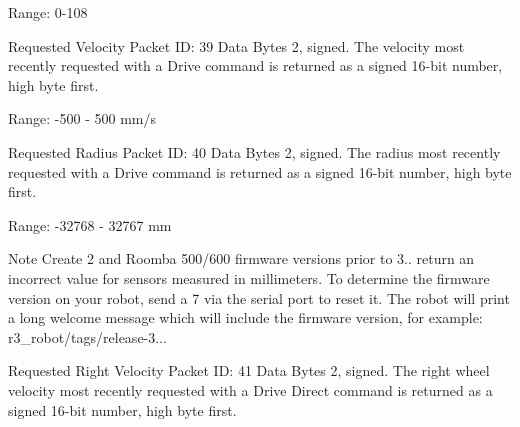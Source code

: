 \begin{Desc}
\begin{description}
Range\+: 0-\/108 \item[{\em 
\hypertarget{group__roomba-lib_gga46f008b5055c4a08d3123c6a3478373eac813a8d1be0b3f7780aa56aa280a426b}{}R\+O\+O\+M\+B\+A\+\_\+\+V\+E\+L\+O\+C\+I\+T\+Y\label{group__roomba-lib_gga46f008b5055c4a08d3123c6a3478373eac813a8d1be0b3f7780aa56aa280a426b}
}]Requested Velocity Packet I\+D\+: 39 Data Bytes 2, signed. The velocity most recently requested with a Drive command is returned as a signed 16-\/bit number, high byte first.

Range\+: -\/500 -\/ 500 mm/s \item[{\em 
\hypertarget{group__roomba-lib_gga46f008b5055c4a08d3123c6a3478373ea59a616d59cce7972a21c6803d1e3e047}{}R\+O\+O\+M\+B\+A\+\_\+\+R\+A\+D\+I\+U\+S\label{group__roomba-lib_gga46f008b5055c4a08d3123c6a3478373ea59a616d59cce7972a21c6803d1e3e047}
}]Requested Radius Packet I\+D\+: 40 Data Bytes 2, signed. The radius most recently requested with a Drive command is returned as a signed 16-\/bit number, high byte first.

Range\+: -\/32768 -\/ 32767 mm

\begin{DoxyNote}{Note}
Create 2 and Roomba 500/600 firmware versions prior to 3.. return an incorrect value for sensors measured in millimeters. To determine the firmware version on your robot, send a 7 via the serial port to reset it. The robot will print a long welcome message which will include the firmware version, for example\+: r3\+\_\+robot/tags/release-\/3... 
\end{DoxyNote}
\item[{\em 
\hypertarget{group__roomba-lib_gga46f008b5055c4a08d3123c6a3478373eae155dc459e649f7a3b38bd8c9b4b14b0}{}R\+O\+O\+M\+B\+A\+\_\+\+V\+E\+L\+O\+C\+I\+T\+Y\+\_\+\+R\+I\+G\+H\+T\label{group__roomba-lib_gga46f008b5055c4a08d3123c6a3478373eae155dc459e649f7a3b38bd8c9b4b14b0}
}]Requested Right Velocity Packet I\+D\+: 41 Data Bytes 2, signed. The right wheel velocity most recently requested with a Drive Direct command is returned as a signed 16-\/bit number, high byte first.


\end{description}
\end{Desc}
